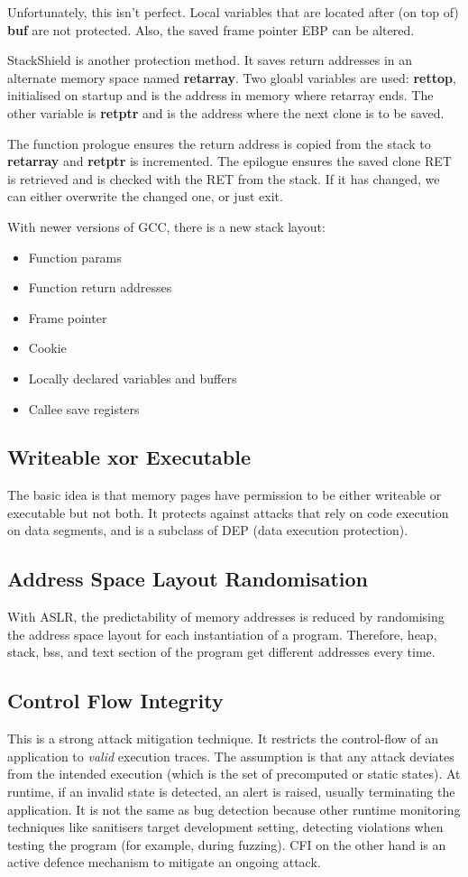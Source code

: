 \documentclass[11pt,a4paper,titlepage,dvipsnames,cmyk]{scrartcl}
\begin{document}
Unfortunately, this isn't perfect. Local variables that are located after (on top of) \textbf{buf} are not protected. Also, the saved frame pointer EBP can be altered.

StackShield is another protection method. It saves return addresses in an alternate memory space named \textbf{retarray}. Two gloabl variables are used: \textbf{rettop}, initialised on startup and is the address in memory where retarray ends. The other variable is \textbf{retptr} and is the address where the next clone is to be saved.

The function prologue ensures the return address is copied from the stack to \textbf{retarray} and \textbf{retptr} is incremented. The epilogue ensures the saved clone RET is retrieved and is checked with the RET from the stack. If it has changed, we can either overwrite the changed one, or just exit.

With newer versions of GCC, there is a new stack layout:
\begin{itemize}
    \item Function params
    \item Function return addresses
    \item Frame pointer
    \item Cookie
    \item Locally declared variables and buffers
    \item Callee save registers
\end{itemize}

\subsection{Writeable xor Executable}
The basic idea is that memory pages have permission to be either writeable or executable but not both. It protects against attacks that rely on code execution on data segments, and is a subclass of DEP (data execution protection).

\subsection{Address Space Layout Randomisation}
With ASLR, the predictability of memory addresses is reduced by randomising the address space layout for each instantiation of a program. Therefore, heap, stack, bss, and text section of the program get different addresses every time.

\subsection{Control Flow Integrity}
This is a strong attack mitigation technique. It restricts the control-flow of an application to \textit{valid} execution traces. The assumption is that any attack deviates from the intended execution (which is the set of precomputed or static states). At runtime, if an invalid state is detected, an alert is raised, usually terminating the application. It is not the same as bug detection because other runtime monitoring techniques like sanitisers target development setting, detecting violations when testing the program (for example, during fuzzing). CFI on the other hand is an active defence mechanism to mitigate an ongoing attack.
\end{document}

